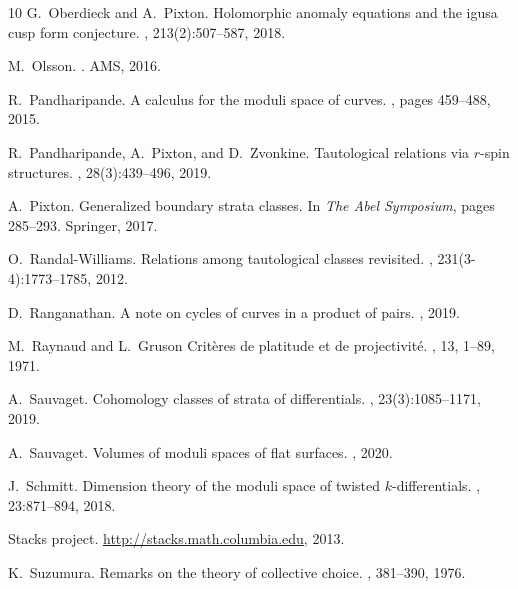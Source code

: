 \documentclass[a4paper,12pt]{article} %
\theoremstyle{definition}
\theoremstyle{plain}%
\begin{document}
\begin{thebibliography}{10}
G.~Oberdieck and A.~Pixton.
\newblock Holomorphic anomaly equations and the igusa cusp form conjecture.
, 213(2):507--587, 2018.

M.~Olsson.
.
\newblock AMS, 2016.

R.~Pandharipande.
\newblock A calculus for the moduli space of curves.
, pages
  459--488, 2015.

R.~Pandharipande, A.~Pixton, and D.~Zvonkine.
\newblock Tautological relations via {$r$}-spin structures.
, 28(3):439--496, 2019.






A.~Pixton.
\newblock Generalized boundary strata classes.
\newblock In {\em The Abel Symposium}, pages 285--293. Springer, 2017.

O.~Randal-Williams.
\newblock Relations among tautological classes revisited.
, 231(3-4):1773--1785, 2012.

D.~Ranganathan.
\newblock A note on cycles of curves in a product of pairs.
, 
  2019.

M.~Raynaud and L.~Gruson
\newblock Crit\`eres de platitude et de projectivit\'e.
, 13, 1--89, 1971.

A.~Sauvaget.
\newblock Cohomology classes of strata of differentials.
, 23(3):1085--1171, 2019.

A.~Sauvaget.
\newblock Volumes of moduli spaces of flat surfaces.
,
  2020.


J.~Schmitt.
\newblock Dimension theory of the moduli space of twisted {$k$}-differentials.
, 23:871--894, 2018.


Stacks project.
\newblock \url{http://stacks.math.columbia.edu}, 2013.

K.~Suzumura.
\newblock Remarks on the theory of collective choice.
, 381--390, 1976.


\end{thebibliography}
\end{document}

